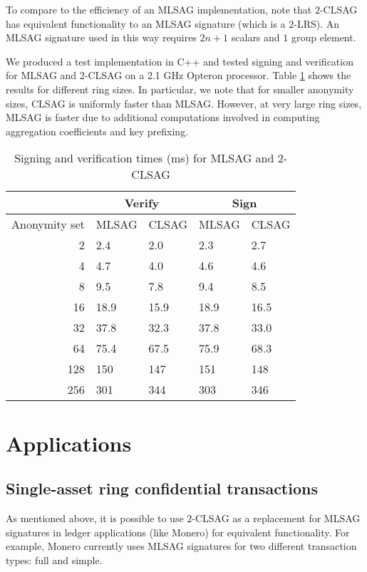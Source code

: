 \documentclass{mrl}
\theoremstyle{plain}
\theoremstyle{definition}
\begin{document}
To compare to the efficiency of an MLSAG implementation, note that $2$-CLSAG has equivalent functionality to an MLSAG signature (which is a $2$-LRS). An MLSAG signature used in this way requires $2n+1$ scalars and $1$ group element. 

We produced a test implementation in C++ and tested signing and verification for MLSAG and $2$-CLSAG on a 2.1 GHz Opteron processor. Table \ref{table:timing} shows the results for different ring sizes. In particular, we note that for smaller anonymity sizes, CLSAG is uniformly faster than MLSAG. However, at very large ring sizes, MLSAG is faster due to additional computations involved in computing aggregation coefficients and key prefixing.

\begin{table}[htp]
\begin{center}
\begin{tabular}{r|ll|ll}
& \multicolumn{2}{c|}{Verify} & \multicolumn{2}{c}{Sign} \\
\hline
Anonymity set & MLSAG & CLSAG & MLSAG & CLSAG \\
\hline
2 & 2.4 & 2.0 & 2.3 & 2.7 \\
4 & 4.7 & 4.0 & 4.6 & 4.6 \\
8 & 9.5 & 7.8 & 9.4 & 8.5 \\
16 & 18.9 & 15.9 & 18.9 & 16.5 \\
32 & 37.8 & 32.3 & 37.8 & 33.0 \\
64 & 75.4 & 67.5 & 75.9 & 68.3 \\
128 & 150 & 147 & 151 & 148 \\
256 & 301 & 344 & 303 & 346
\end{tabular}
\end{center}
\caption{Signing and verification times (ms) for MLSAG and $2$-CLSAG}
\label{table:timing}
\end{table}


\section{Applications}
\subsection{Single-asset ring confidential transactions}\label{sec:ringct}
As mentioned above, it is possible to use $2$-CLSAG as a replacement for MLSAG signatures in  ledger applications (like Monero) for equivalent functionality. For example, Monero currently uses MLSAG signatures for two different transaction types: full and simple.
\end{document}
